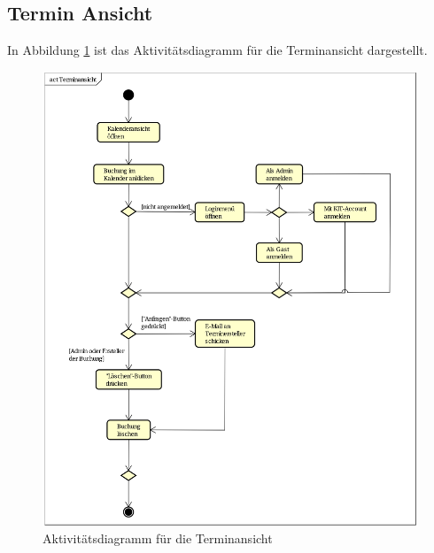 \subsection{Termin Ansicht}
In Abbildung \ref{fig:activity_diagram_calendar} ist das Aktivitätsdiagramm für die Terminansicht dargestellt.
\begin{figure}[ht]
    \centering
    \includegraphics[scale=0.25]{figures/activitydiagrams/terminansicht}
    \caption{Aktivitätsdiagramm für die Terminansicht}
    \label{fig:activity_diagram_calendar}
\end{figure}